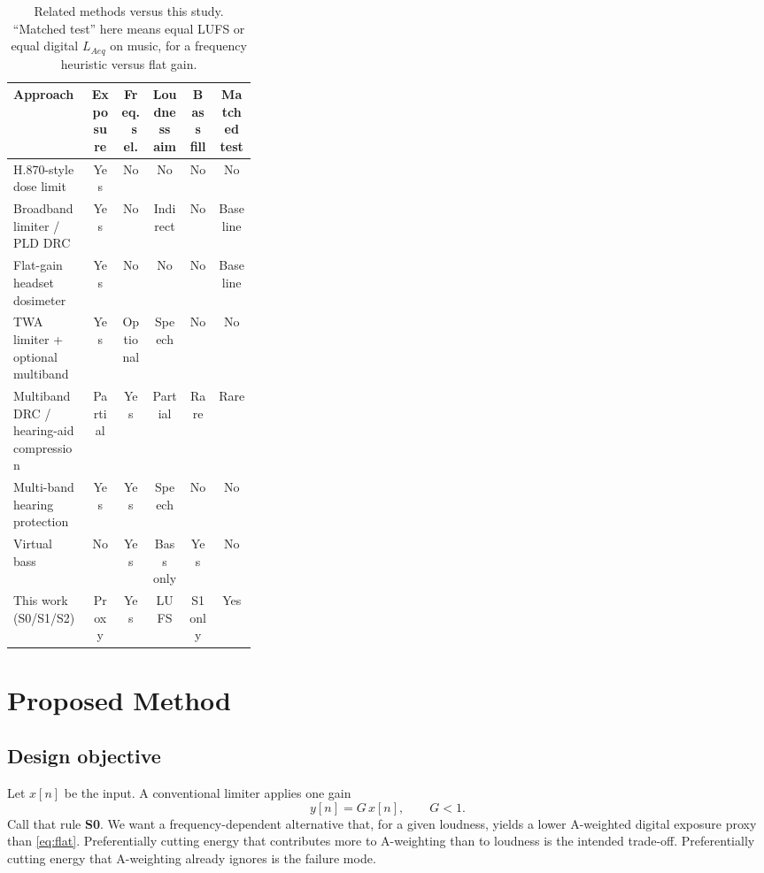 \documentclass[12pt,journal,onecolumn]{IEEEtran}
\begin{document}
\begin{table}[!htbp]
\caption{Related methods versus this study. ``Matched test'' here means equal LUFS or equal digital $L_{Aeq}$ on music, for a frequency heuristic versus flat gain.}
\label{tab:gap}
\centering
\renewcommand{\arraystretch}{1.12}
\begin{tabular}{>{\raggedright\arraybackslash}p{0.32\linewidth} c c c c c}
\hline
Approach & Exposure & Freq.\ sel. & Loudness aim & Bass fill & Matched test \\
\hline
H.870-style dose limit \cite{H870} & Yes & No & No & No & No \\
Broadband limiter / PLD DRC \cite{Giannoulis2012,Chen2023} & Yes & No & Indirect & No & Baseline \\
Flat-gain headset dosimeter \cite{US6826515} & Yes & No & No & No & Baseline \\
TWA limiter + optional multiband \cite{US9980028} & Yes & Optional & Speech & No & No \\
Multiband DRC / hearing-aid compression \cite{Kates2008} & Partial & Yes & Partial & Rare & Rare \\
Multi-band hearing protection \cite{Fathima2026,US11006215} & Yes & Yes & Speech & No & No \\
Virtual bass \cite{Gan2001} & No & Yes & Bass only & Yes & No \\
This work (S0/S1/S2) & Proxy & Yes & LUFS & S1 only & Yes \\
\hline
\end{tabular}
\end{table}

\section{Proposed Method}
\label{sec:method}

\subsection{Design objective}

Let $x[n]$ be the input. A conventional limiter applies one gain
\begin{equation}
y[n] = G\, x[n], \qquad G < 1.
\label{eq:flat}
\end{equation}
Call that rule \textbf{S0}. We want a frequency-dependent alternative that, for a given loudness, yields a lower A-weighted digital exposure proxy than \eqref{eq:flat}. Preferentially cutting energy that contributes more to A-weighting than to loudness is the intended trade-off. Preferentially cutting energy that A-weighting already ignores is the failure mode.
\end{document}
